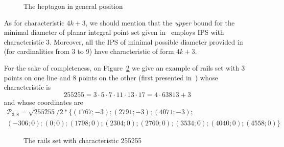 \documentclass[a4paper,14pt]{article} %
\theoremstyle{plain}
\theoremstyle{definition}
\begin{document}
\begin{figure}
\caption{The heptagon in general position}
\label{fig:heptagon2}
\end{figure}

As for characteristic $4k+3$, we should mention that the \emph{upper} bound for the minimal diameter
of planar integral point set given in~\cite{harborth1993upper} employs IPS with characteristic $3$.
Moreover, all the IPS of minimal possible diameter provided in~\cite[\S 5, Figure 1]{harborth1993upper}
(for cardinalities from 3 to 9) have characteristic of form $4k+3$.

For the sake of completeness, on Figure~\ref{fig:11_2432_255255_a0a1b7f805cfc93080b4608505a0f45d_rails_3.png}
we give an example of rails set
with 3 points on one line and 8 points on the other (first presented in~\cite[Figure 1]{avdeev2019particular})
whose characteristic is
\begin{equation}
	255255 = 3 \cdot 5 \cdot 7 \cdot 11 \cdot 13 \cdot 17
	 = 4 \cdot 63813  + 3
\end{equation}
and whose coordinates are
\begin{multline}
\mathcal{P}_{3,8}=\sqrt{255255}/2*\{
	( 1767 ; -3);
	( 2791 ; -3);
	( 4071 ; -3);
\\
	( -306 ; 0);
	( 0 ; 0);
	( 1798 ; 0);
	( 2304 ; 0);
	( 2760 ; 0);
	( 3534 ; 0);
	( 4040 ; 0);
	( 4558 ; 0)
\}
\end{multline}

\begin{figure}
\caption{The rails set with characteristic 255255}
\label{fig:11_2432_255255_a0a1b7f805cfc93080b4608505a0f45d_rails_3.png}
\end{figure}
\end{document}
